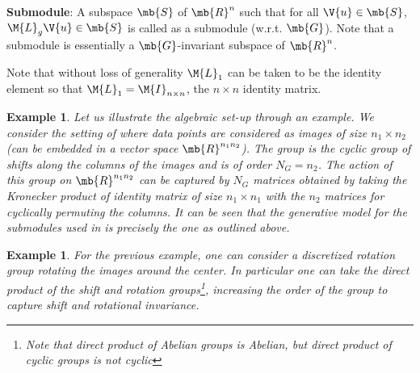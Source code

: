 \documentclass[conference]{IEEEtran}
\newtheorem{example}[theorem]{Example}
\begin{document}

\textbf{Submodule}: A subspace $\mb{S}$ of $\mb{R}^n$ such that for all $\V{u} \in \mb{S}$, $\M{L}_g \V{u} \in \mb{S}$ is called as a submodule (w.r.t. $\mb{G}$). Note that a submodule is essentially a $\mb{G}$-invariant subspace of $\mb{R}^n$. 

Note that without loss of generality $\M{L}_1$ can be taken to be the identity element so that $\M{L}_1 = \M{I}_{n\times n}$, the $n \times n$ identity matrix.  

\begin{example}
Let us illustrate the algebraic set-up through an example. We consider the setting of \cite{Kernfeld:2014wta} where data points are considered as images of size $n_1 \times n_2$ (can be embedded in a vector space $\mb{R}^{n_1 n_2}$). The group is the cyclic group of shifts along the columns of the images and is of order $N_G = n_2$. The action of this group on $\mb{R}^{n_1 n_2}$ can be captured by $N_G$ matrices obtained by taking the Kronecker product of identity matrix of size $n_1 \times n_1$ with the $n_2$ matrices for cyclically permuting the columns. It can be seen that the generative model for the submodules used in \cite{Kernfeld:2014wta} is precisely the one as outlined above.
\end{example}

\begin{example}
For the previous example, one can consider a discretized rotation group rotating the images around the center. In particular one can take the direct product of the shift and rotation groups\footnote{Note that direct product of Abelian groups is Abelian, but direct product of cyclic groups is not cyclic}, increasing the order of the group to capture shift and rotational invariance.
\end{example}
\end{document}
